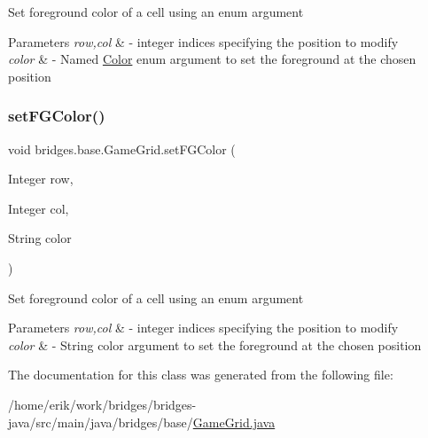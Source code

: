 Set foreground color of a cell using an enum argument


\begin{DoxyParams}{Parameters}
{\em row,col} & -\/ integer indices specifying the position to modify \\
\hline
{\em color} & -\/ Named \hyperlink{classbridges_1_1base_1_1_color}{Color} enum argument to set the foreground at the chosen position \\
\hline
\end{DoxyParams}
\mbox{\label{classbridges_1_1base_1_1_game_grid_a860f2669ba46bc7691f4bb5c7adf907b}} 
\subsubsection{\texorpdfstring{set\+F\+G\+Color()}{setFGColor()}\hspace{0.1cm}{\footnotesize\ttfamily [2/2]}}
{\footnotesize\ttfamily void bridges.\+base.\+Game\+Grid.\+set\+F\+G\+Color (\begin{DoxyParamCaption}\item[{Integer}]{row,  }\item[{Integer}]{col,  }\item[{String}]{color }\end{DoxyParamCaption})}

Set foreground color of a cell using an enum argument


\begin{DoxyParams}{Parameters}
{\em row,col} & -\/ integer indices specifying the position to modify \\
\hline
{\em color} & -\/ String color argument to set the foreground at the chosen position \\
\hline
\end{DoxyParams}


The documentation for this class was generated from the following file\+:\begin{DoxyCompactItemize}
\item 
/home/erik/work/bridges/bridges-\/java/src/main/java/bridges/base/\hyperlink{_game_grid_8java}{Game\+Grid.\+java}\end{DoxyCompactItemize}
